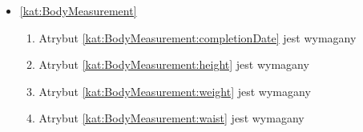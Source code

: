 \begin{itemize}[label={\textbf{Ograniczenia dla}}, wide, labelwidth=!, labelindent=0pt]

    \item\ref{kat:BodyMeasurement}\mynobreakpar
    \begin{enumerate}[label={\textbf{OGR/5/\protect\twodigits{\arabic{enumi}}}}, wide, labelwidth=!, align=left, leftmargin=3cm, resume]
        \item Atrybut \ref{kat:BodyMeasurement:completionDate} jest wymagany
        \item Atrybut \ref{kat:BodyMeasurement:height} jest wymagany
        \item Atrybut \ref{kat:BodyMeasurement:weight} jest wymagany
        \item Atrybut \ref{kat:BodyMeasurement:waist} jest wymagany


\end{enumerate}
\end{itemize}
